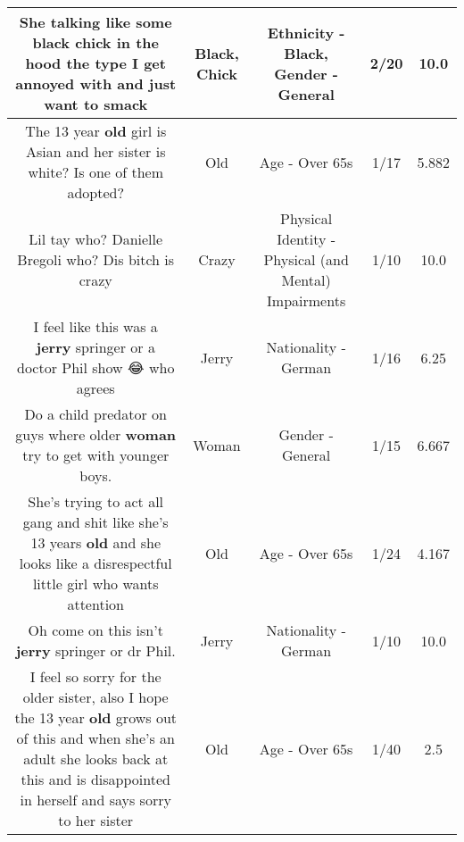 \documentclass[11pt]{article}
\newlength\mylength
\begin{document}
\begin{center}
\begin{longtable}{|C{.65\mylength}|C{.30\mylength}|C{.12\mylength}|C{.12\mylength}|C{.12\mylength}|}
  \small She talking like some \textbf{black} \textbf{chick} in the hood the type I get annoyed with and just want to smack\normalsize   & Black, Chick & Ethnicity - Black, Gender - General & 2/20 & 10.0 \\  \hline
  \small The 13 year \textbf{old} girl is Asian and her sister is white? Is one of them adopted?\normalsize   & Old & Age - Over 65s & 1/17 & 5.882 \\  \hline
  \small Lil tay who? Danielle Bregoli who? Dis bitch is crazy\normalsize   & Crazy & Physical Identity - Physical (and Mental) Impairments & 1/10 & 10.0 \\  \hline
  \small I feel like this was a \textbf{jerry} springer or a doctor Phil show 😂 who agrees\normalsize   & Jerry & Nationality - German & 1/16 & 6.25 \\  \hline
  \small Do a child predator on guys where older \textbf{woman} try to get with younger boys.\normalsize   & Woman & Gender - General & 1/15 & 6.667 \\  \hline
  \small She's trying to act all gang and shit like she's 13 years \textbf{old} and she looks like a disrespectful little girl who wants attention\normalsize   & Old & Age - Over 65s & 1/24 & 4.167 \\  \hline
  \small Oh come on this isn't \textbf{jerry} springer or dr Phil.\normalsize   & Jerry & Nationality - German & 1/10 & 10.0 \\  \hline
  \small I feel so sorry for the older sister, also I hope the 13 year \textbf{old} grows out of this and when she's an adult she looks back at this and is disappointed in herself and says sorry to her sister\normalsize   & Old & Age - Over 65s & 1/40 & 2.5 \\  \hline

\end{longtable}
\end{center}
\end{document}
